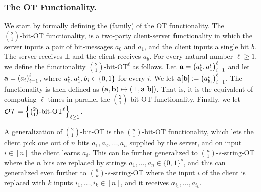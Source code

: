 \documentclass{llncs}
\newcommand{\OTfunc}{\mathcal{OT}}
\newcommand{\bOT}[2]{\binom{#2}{#1}\text{-bit-OT}}
\newcommand{\sOT}[3]{\binom{#2}{#1}\text{-}#3\text{-string-OT}}
\begin{document}
\subsubsection*{The OT Functionality.}
We start by formally defining the (family) of the OT functionality. The $\bOT12$ functionality, is a two-party client-server functionality in which the server inputs a pair of bit-messages $a_0$ and $a_1$, and the client inputs a single bit $b$. The server receives $\bot$ and the client receives $a_b$. For every natural number $\ell\geq1$, we define the functionality $\bOT12^{\ell}$ as follows. Let ${\bf a}=\left ( a_0^i,a_1^i \right )_{i=1}^{\ell}$ and let ${\bf a}=\left ( a_i \right )_{i=1}^{\ell}$, where $a_0^i,a_1^i,b_i\in\{0,1\}$ for every $i$. We let ${\bf a}[{\bf b}]:=\left ( a^i_{b_i} \right )_{i=1}^{\ell}$. The functionality is then defined as $\left ( {\bf a},{\bf b} \right )\mapsto\left ( \bot,{\bf a}[{\bf b}] \right )$. That is, it is the equivalent of computing $\ell$ times in parallel the $\bOT12$ functionality. Finally, we let $\OTfunc=\set{\bOT12^{\ell}}_{\ell\geq1}$.

A generalization of $\bOT{1}{2}$ is the $\bOT{1}{n}$ functionality, which lets the client pick one out of $n$ bits $a_1,a_2,\ldots,a_n$ supplied by the server, and on input $i\in[n]$ the client learns $a_i$. This can be further generalized to $\sOT{1}{n}{s}$ where the $n$ bits are replaced by strings $a_1,\ldots,a_n\in \{0,1\}^s$, and this can generalized even further to $\sOT{k}{n}{s}$ where the input $i$ of the client is replaced with $k$ inputs $i_1,\ldots,i_k\in[n]$, and it receives $a_{i_1},\ldots,a_{i_k}$.
\end{document}
